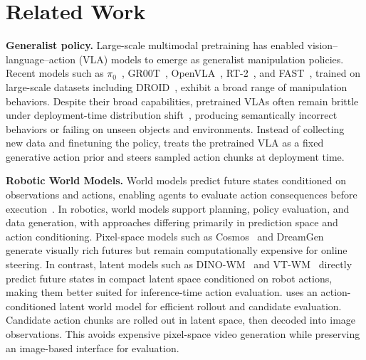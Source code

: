 \providecommand{\cmark}{}
\providecommand{\xmark}{}
\renewcommand{\cmark}{\ding{51}}
\renewcommand{\xmark}{\ding{55}}

\section{Related Work}

\textbf{Generalist policy.}
Large-scale multimodal pretraining has enabled vision--language--action (VLA) models to emerge as generalist manipulation policies. Recent models such as $\pi_0$~\citep{black2410pi0}, GR00T~\citep{bjorck2025gr00t}, OpenVLA~\citep{kim2024openvla}, RT-2~\citep{zitkovich2023rt}, and FAST~\citep{pertsch2025fast}, trained on large-scale datasets including DROID~\citep{khazatsky2024droid}, exhibit a broad range of manipulation
behaviors. Despite their broad capabilities, pretrained VLAs often remain brittle under deployment-time distribution shift~\citep{nakamoto2024steering,wu2025foresight,qi2025strengthening}, producing semantically incorrect behaviors or failing on unseen objects and environments. Instead of collecting new data and finetuning the policy, \coolname{} treats the pretrained VLA as a fixed generative action prior and steers sampled action chunks at deployment time.

\textbf{Robotic World Models.}
World models predict future states conditioned on observations and actions, enabling agents to evaluate action consequences before execution~\citep{agarwal2025cosmos,assran2025v,zhou2411dino}. In robotics, world models support planning, policy evaluation, and data generation, with approaches differing primarily in prediction space and action conditioning. Pixel-space models such as Cosmos~\citep{agarwal2025cosmos} and DreamGen~\citep{jang2025dreamgen} generate visually rich futures but remain computationally expensive for online steering. In contrast, latent models such as DINO-WM~\citep{zhou2411dino} and VT-WM~\cite{higuera2026visuo} directly predict future states in compact latent space conditioned on robot actions, making them better suited for inference-time action evaluation.
\coolname{} uses an action-conditioned latent world model for efficient rollout and candidate evaluation. Candidate action chunks are rolled out in latent space, then decoded into image observations. This avoids expensive pixel-space video generation while preserving an image-based interface for evaluation.

